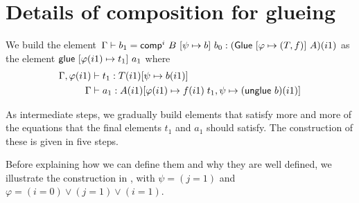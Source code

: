 \section{Details of composition for
  glueing}\label{appendix:composition-glueing}

We build the element~$\Gamma \vdash b_1 = {\sf comp}^i~B~[\psi\mapsto
b]~b_0:({\sf Glue}~[\varphi\mapsto(T,f{})]~A)(i1)$ as the element
${\sf glue}~[\varphi(i1) \mapsto t_1]~a_1$ where
%
\begin{align*}
  \Gamma,\varphi(i1) \vdash & \; t_1 : T(i1)[\psi \mapsto b(i1)]\\
  \Gamma \vdash & \; a_1 : A(i1)[\varphi(i1) \mapsto f{}(i1) \; t_1,\psi \mapsto ({\sf unglue}~b)(i1)]
\end{align*}

As intermediate steps, we gradually build elements that satisfy more
and more of the equations that the final elements $t_1$ and $a_1$
should satisfy. The construction of these is given in five steps.

Before explaining how we can define them and why they are well
defined, we illustrate the construction in ,
with $\psi = (j=1)$ and $\varphi = (i=0) \vee (j=1)\vee (i=1)$.


